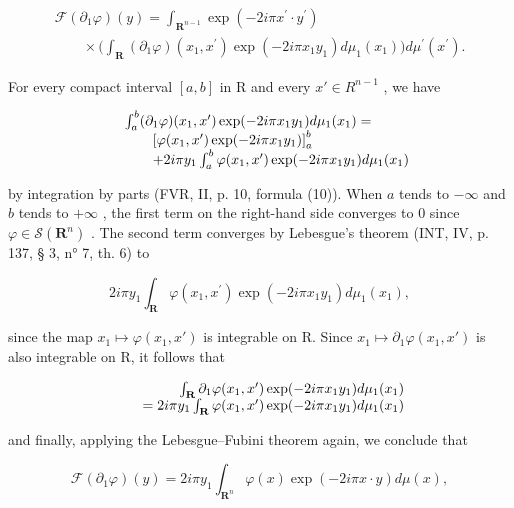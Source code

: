 \[
\begin{array}{l} \mathcal {F} (\partial_ {1} \varphi) (y) = \int_ {\mathbf {R} ^ {n - 1}} \exp (- 2 i \pi   x ^ {\prime} \cdot y ^ {\prime}) \\ \qquad \times \Big (\int_ {\mathbf {R}} (\partial_ {1} \varphi) (x _ {1}, x ^ {\prime}) \exp (- 2 i \pi   x _ {1} y _ {1}) d \mu_ {1} (x _ {1}) \Big) d \mu^ {\prime} (x ^ {\prime}). \end{array}
\]

For every compact interval \([a,b]\) in R and every \(x'\in R^{n-1}\) , we have

\[
\begin{array}{r l} & {\int_ {a} ^ {b} (\partial_ {1} \varphi) (x _ {1}, x ^ {\prime}) \exp (- 2 i \pi x _ {1} y _ {1}) d \mu_ {1} (x _ {1}) =} \\ & {\qquad \left[ \varphi (x _ {1}, x ^ {\prime}) \exp (- 2 i \pi x _ {1} y _ {1}) \right] _ {a} ^ {b}} \\ & {\qquad + 2 i \pi y _ {1} \int_ {a} ^ {b} \varphi (x _ {1}, x ^ {\prime}) \exp (- 2 i \pi x _ {1} y _ {1}) d \mu_ {1} (x _ {1})} \end{array}
\]

by integration by parts (FVR, II, p. 10, formula (10)). When \(a\) tends to \(-\infty\) and \(b\) tends to \(+\infty\) , the first term on the right-hand side converges to 0 since \(\varphi \in \mathcal{S}(\mathbf{R}^n)\) . The second term converges by Lebesgue's theorem (INT, IV, p. 137, § 3, n° 7, th. 6) to

\[
2 i \pi y _ {1} \int_ {\mathbf {R}} \varphi (x _ {1}, x ^ {\prime}) \exp (- 2 i \pi x _ {1} y _ {1}) d \mu_ {1} (x _ {1}),
\]

since the map \(x_{1} \mapsto \varphi(x_{1}, x')\) is integrable on R. Since \(x_{1} \mapsto \partial_{1}\varphi(x_{1}, x')\) is also integrable on R, it follows that

\[
\begin{array}{r l r} & & {\int_ {\mathbf {R}} \partial_ {1} \varphi (x _ {1}, x ^ {\prime}) \exp (- 2 i \pi x _ {1} y _ {1}) d \mu_ {1} (x _ {1})} \\ & & {= 2 i \pi y _ {1} \int_ {\mathbf {R}} \varphi (x _ {1}, x ^ {\prime}) \exp (- 2 i \pi x _ {1} y _ {1}) d \mu_ {1} (x _ {1})} \end{array}
\]

and finally, applying the Lebesgue--Fubini theorem again, we conclude that

\[
\mathcal {F} (\partial_ {1} \varphi) (y) = 2 i \pi y _ {1} \int_ {\mathbf {R} ^ {n}} \varphi (x) \exp (- 2 i \pi x \cdot y) d \mu (x),
\]

